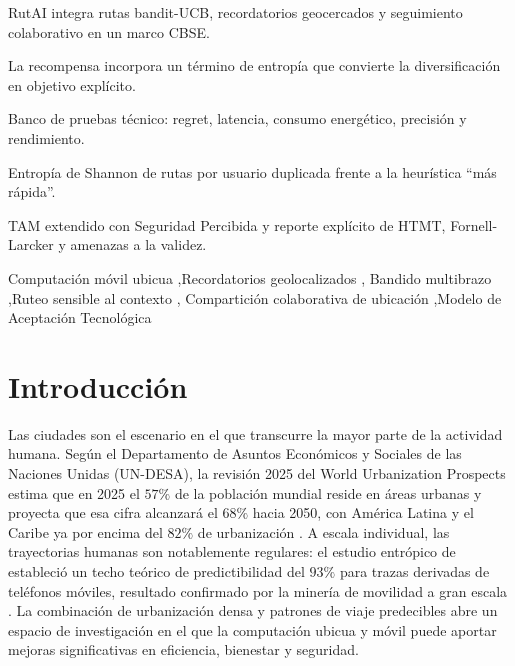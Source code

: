 \documentclass[a4paper,fleqn]{cas-sc}
\newcommand{\RUTAI}{RutAI\xspace}
\newcommand{\UCB}{UCB\xspace}
\newcommand{\TAM}{TAM\xspace}
\begin{document}
	\begin{highlights}
		\item \RUTAI integra rutas bandit-\UCB, recordatorios geocercados y seguimiento colaborativo en un marco CBSE.
		\item La recompensa incorpora un t\'ermino de entrop\'ia que convierte la diversificaci\'on en objetivo expl\'icito.
		\item Banco de pruebas t\'ecnico: regret, latencia, consumo energ\'etico, precisi\'on y rendimiento.
		\item Entrop\'ia de Shannon de rutas por usuario duplicada frente a la heur\'istica ``m\'as r\'apida''.
		\item \TAM extendido con Seguridad Percibida y reporte expl\'icito de HTMT, Fornell-Larcker y amenazas a la validez.
	\end{highlights}
	
	\begin{keywords}
		Computaci\'on m\'ovil ubicua \sep Recordatorios geolocalizados \sep
		Bandido multibrazo \sep Ruteo sensible al contexto \sep
		Compartici\'on colaborativa de ubicaci\'on \sep Modelo de Aceptaci\'on Tecnol\'ogica
	\end{keywords}
	
	\maketitle
	
	\section{Introducci\'on}\label{sec:intro}
	
	Las ciudades son el escenario en el que transcurre la mayor parte de la actividad humana. Seg\'un el Departamento de Asuntos Econ\'omicos y Sociales de las Naciones Unidas (UN-DESA), la revisi\'on 2025 del World Urbanization Prospects estima que en 2025 el $57\%$ de la poblaci\'on mundial reside en \'areas urbanas y proyecta que esa cifra alcanzar\'a el $68\%$ hacia 2050, con Am\'erica Latina y el Caribe ya por encima del $82\%$ de urbanizaci\'on \citep{undesa2025wup}. A escala individual, las trayectorias humanas son notablemente regulares: el estudio entr\'opico de \citet{song2010predictability} estableci\'o un techo te\'orico de predictibilidad del $93\%$ para trazas derivadas de tel\'efonos m\'oviles, resultado confirmado por la miner\'ia de movilidad a gran escala \citep{cagney2025urban,liu2022route}. La combinaci\'on de urbanizaci\'on densa y patrones de viaje predecibles abre un espacio de investigaci\'on en el que la computaci\'on ubicua y m\'ovil puede aportar mejoras significativas en eficiencia, bienestar y seguridad.
	
\end{document}
